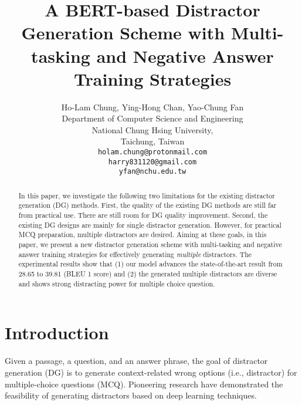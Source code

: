 \documentclass[11pt,a4paper]{article}
\title{A BERT-based Distractor Generation Scheme with Multi-tasking and Negative Answer Training Strategies}
\author{ 
  Ho-Lam Chung, Ying-Hong Chan, Yao-Chung Fan \\
Department of Computer Science and Engineering \\
  National Chung Hsing University, \\
     Taichung, Taiwan \\
  {\tt holam.chung@protonmail.com}\\
  {\tt harry831120@gmail.com}\\
  {\tt yfan@nchu.edu.tw}\\
  }
\date{}
\begin{document}
\maketitle
\begin{abstract}
In this paper, we investigate the following two limitations for the existing distractor generation (DG) methods. First, the quality of the existing DG methods are still far from practical use. There are still room for DG quality improvement. Second, the existing DG designs are mainly for single distractor generation. However, for practical MCQ preparation, multiple distractors are desired. Aiming at these goals, in this paper, we present a new distractor generation scheme with multi-tasking and negative answer training strategies for effectively generating \textit{multiple} distractors. The experimental results show that (1) our model advances the state-of-the-art result from 28.65 to 39.81 (BLEU 1 score) and (2) the generated multiple distractors are diverse and shows strong distracting power for multiple choice question.
\end{abstract}

\section{Introduction}\label{sec:intro}
Given a passage, a question, and an answer phrase, the goal of distractor generation (DG) is to generate context-related wrong options (i.e., distractor) for multiple-choice questions (MCQ). Pioneering research \cite{gao2019generating,yeung2019difficulty,zhou2019coattention} have demonstrated the feasibility of generating distractors based on deep learning techniques. 
\end{document}
